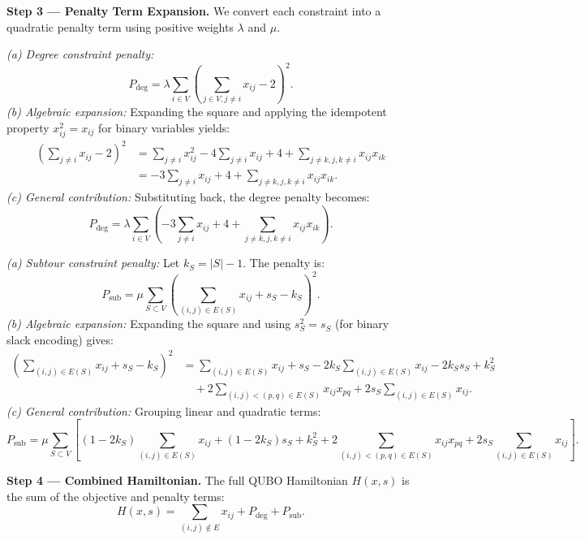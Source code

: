 \documentclass[12pt]{article}
\begin{document}
\textbf{Step 3 --- Penalty Term Expansion.}
We convert each constraint into a quadratic penalty term using positive weights $\lambda$ and $\mu$.

\textit{(a) Degree constraint penalty:}
\begin{equation}
P_{\text{deg}} = \lambda \sum_{i \in V} \left( \sum_{j \in V, j \neq i} x_{ij} - 2 \right)^2.
\end{equation}
\textit{(b) Algebraic expansion:}
Expanding the square and applying the idempotent property $x_{ij}^2 = x_{ij}$ for binary variables yields:
\begin{align}
\left( \sum_{j \neq i} x_{ij} - 2 \right)^2 &= \sum_{j \neq i} x_{ij}^2 - 4 \sum_{j \neq i} x_{ij} + 4 + \sum_{j \neq k, j,k \neq i} x_{ij} x_{ik} \nonumber \\
&= -3 \sum_{j \neq i} x_{ij} + 4 + \sum_{j \neq k, j,k \neq i} x_{ij} x_{ik}.
\end{align}
\textit{(c) General contribution:}
Substituting back, the degree penalty becomes:
\begin{equation}
P_{\text{deg}} = \lambda \sum_{i \in V} \left( -3 \sum_{j \neq i} x_{ij} + 4 + \sum_{j \neq k, j,k \neq i} x_{ij} x_{ik} \right).
\end{equation}

\textit{(a) Subtour constraint penalty:}
Let $k_S = |S|-1$. The penalty is:
\begin{equation}
P_{\text{sub}} = \mu \sum_{S \subset V} \left( \sum_{(i,j) \in E(S)} x_{ij} + s_S - k_S \right)^2.
\end{equation}
\textit{(b) Algebraic expansion:}
Expanding the square and using $s_S^2 = s_S$ (for binary slack encoding) gives:
\begin{align}
\left( \sum_{(i,j) \in E(S)} x_{ij} + s_S - k_S \right)^2 &= \sum_{(i,j) \in E(S)} x_{ij} + s_S - 2k_S \sum_{(i,j) \in E(S)} x_{ij} - 2k_S s_S + k_S^2 \nonumber \\
&\quad + 2 \sum_{(i,j)<(p,q) \in E(S)} x_{ij} x_{pq} + 2 s_S \sum_{(i,j) \in E(S)} x_{ij}.
\end{align}
\textit{(c) General contribution:}
Grouping linear and quadratic terms:
\begin{equation}
P_{\text{sub}} = \mu \sum_{S \subset V} \left[ (1-2k_S) \sum_{(i,j) \in E(S)} x_{ij} + (1-2k_S) s_S + k_S^2 + 2 \sum_{(i,j)<(p,q) \in E(S)} x_{ij} x_{pq} + 2 s_S \sum_{(i,j) \in E(S)} x_{ij} \right].
\end{equation}

\textbf{Step 4 --- Combined Hamiltonian.}
The full QUBO Hamiltonian $H(x,s)$ is the sum of the objective and penalty terms:
\begin{equation}
H(x,s) = \sum_{(i,j) \notin E} x_{ij} + P_{\text{deg}} + P_{\text{sub}}.
\end{equation}
\end{document}
